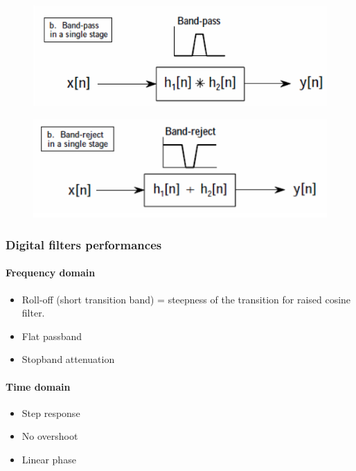 \begin{minipage}{0.45\linewidth}
\begin{figure}[H]
    \centering
    \includegraphics[width = \textwidth]{L6/img/band-pass.PNG}
\end{figure}
\end{minipage}\hfill
\begin{minipage}{0.45\linewidth}
\begin{figure}[H]
    \centering
    \includegraphics[width = \textwidth]{L6/img/band-reject.PNG}
\end{figure}
\end{minipage}


\subsubsection{Digital filters performances}

\begin{minipage}{0.45 \linewidth}
\paragraph{Frequency domain}
\begin{itemize}
    \item Roll-off (short
    transition band) = steepness of the transition for raised cosine filter.
    \item Flat passband
    \item Stopband
    attenuation
\end{itemize}
\end{minipage}\hfill
\begin{minipage}{0.45 \linewidth}
\paragraph{Time domain}

\begin{itemize}
    \item Step response
    \item No overshoot
    \item Linear phase
\end{itemize}

\end{minipage}

